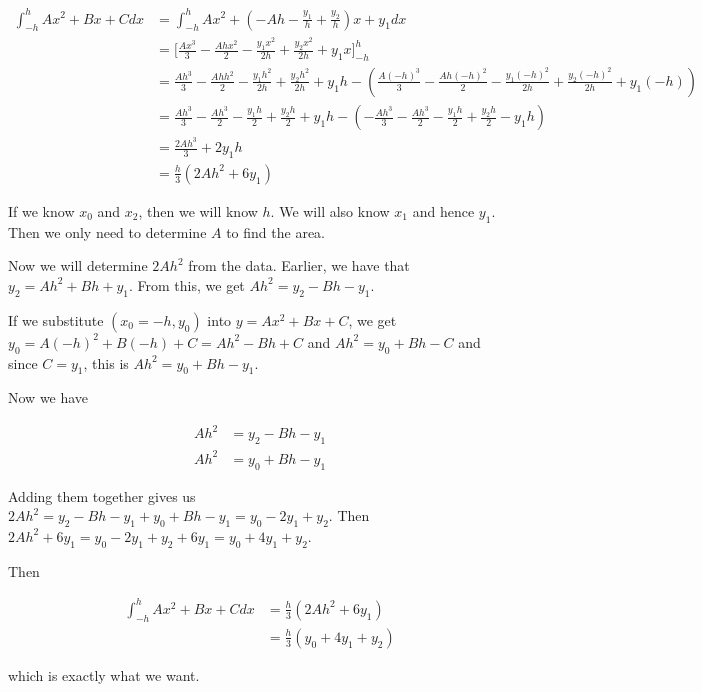 \documentclass[9pt]{article}
\begin{document}
\begin{align*}
  \int_{-h}^h Ax^2 + Bx + C dx &= \int_{-h}^h Ax^2 + (-Ah - \frac{y_1}{h} + \frac{y_2}{h})x + y_1 dx \\
  &= \bigg[ \frac{Ax^3}{3} - \frac{Ahx^2}{2} - \frac{y_1x^2}{2h} + \frac{y_2x^2}{2h} + y_1x \bigg]_{-h}^h \\
  &= \frac{Ah^3}{3} - \frac{Ahh^2}{2} - \frac{y_1h^2}{2h} + \frac{y_2h^2}{2h} + y_1h - (\frac{A(-h)^3}{3} - \frac{Ah(-h)^2}{2} - \frac{y_1(-h)^2}{2h} + \frac{y_2(-h)^2}{2h} + y_1(-h)) \\
  &= \frac{Ah^3}{3} - \frac{Ah^3}{2} - \frac{y_1h}{2} + \frac{y_2h}{2} + y_1h - (-\frac{Ah^3}{3} - \frac{Ah^3}{2} - \frac{y_1h}{2} + \frac{y_2h}{2} - y_1h) \\
  &= \frac{2Ah^3}{3} + 2y_1h \\
  &= \frac{h}{3}(2Ah^2 + 6y_1)
\end{align*}

If we know $x_0$ and $x_2$, then we will know $h$. We will also know $x_1$ and hence $y_1$. Then we only need to determine $A$ to find the area.

Now we will determine $2Ah^2$ from the data. Earlier, we have that $y_2 = Ah^2 + Bh + y_1$. From this, we get $Ah^2 = y_2 - Bh - y_1$.

If we substitute $(x_0 = -h, y_0)$ into $y = Ax^2 + Bx + C$, we get $y_0 = A(-h)^2 + B(-h) + C = Ah^2 - Bh + C$ and $Ah^2 = y_0 + Bh - C$ and since $C = y_1$, this is $Ah^2 = y_0 + Bh - y_1$.

Now we have

\begin{align*}
  Ah^2 &= y_2 - Bh - y_1 \\
  Ah^2 &= y_0 + Bh - y_1
\end{align*}

Adding them together gives us $2Ah^2 = y_2 - Bh - y_1 + y_0 + Bh - y_1 = y_0 - 2y_1 + y_2$. Then $2Ah^2 + 6y_1 = y_0 - 2y_1 + y_2 + 6y_1 = y_0 + 4y_1 + y_2$.

Then

\begin{align*}
  \int_{-h}^h Ax^2 + Bx + C dx &= \frac{h}{3}(2Ah^2 + 6y_1) \\
  &= \frac{h}{3}(y_0 + 4y_1 + y_2)
\end{align*}

which is exactly what we want.
\end{document}
